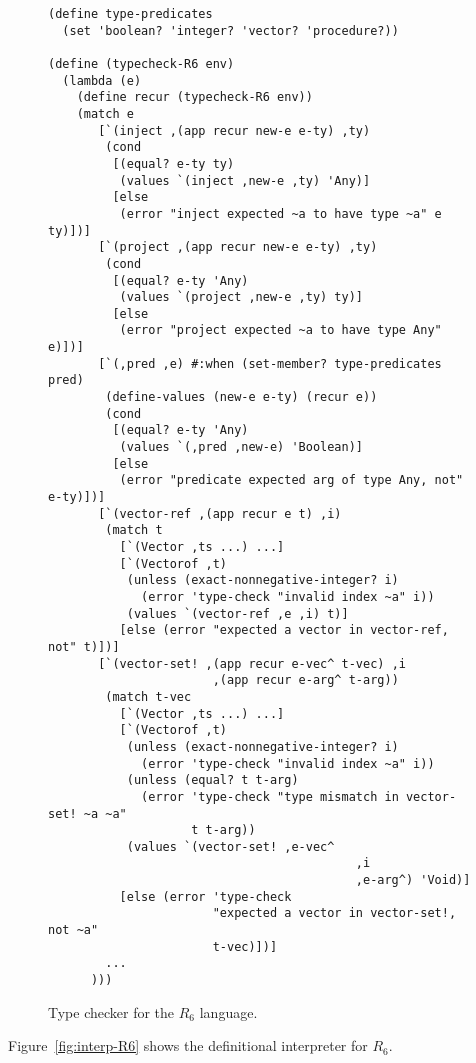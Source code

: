 \documentclass[11pt]{book}
\begin{document}
\begin{figure}[tbp]
\begin{lstlisting}[basicstyle=\ttfamily\footnotesize]
(define type-predicates
  (set 'boolean? 'integer? 'vector? 'procedure?))

(define (typecheck-R6 env)
  (lambda (e)
    (define recur (typecheck-R6 env))
    (match e
       [`(inject ,(app recur new-e e-ty) ,ty)
        (cond
         [(equal? e-ty ty)
          (values `(inject ,new-e ,ty) 'Any)]
         [else
          (error "inject expected ~a to have type ~a" e ty)])]
       [`(project ,(app recur new-e e-ty) ,ty)
        (cond
         [(equal? e-ty 'Any)
          (values `(project ,new-e ,ty) ty)]
         [else
          (error "project expected ~a to have type Any" e)])]
       [`(,pred ,e) #:when (set-member? type-predicates pred)
        (define-values (new-e e-ty) (recur e))
        (cond
         [(equal? e-ty 'Any)
          (values `(,pred ,new-e) 'Boolean)]
         [else
          (error "predicate expected arg of type Any, not" e-ty)])]
       [`(vector-ref ,(app recur e t) ,i)
        (match t
          [`(Vector ,ts ...) ...]
          [`(Vectorof ,t)
           (unless (exact-nonnegative-integer? i)
             (error 'type-check "invalid index ~a" i))
           (values `(vector-ref ,e ,i) t)]
          [else (error "expected a vector in vector-ref, not" t)])]
       [`(vector-set! ,(app recur e-vec^ t-vec) ,i
                       ,(app recur e-arg^ t-arg))
        (match t-vec
          [`(Vector ,ts ...) ...]
          [`(Vectorof ,t)
           (unless (exact-nonnegative-integer? i)
             (error 'type-check "invalid index ~a" i))
           (unless (equal? t t-arg)
             (error 'type-check "type mismatch in vector-set! ~a ~a"
                    t t-arg))
           (values `(vector-set! ,e-vec^
                                           ,i
                                           ,e-arg^) 'Void)]
          [else (error 'type-check
                       "expected a vector in vector-set!, not ~a"
                       t-vec)])]
        ...
      )))
\end{lstlisting}
\caption{Type checker for the $R_6$ language.}
\label{fig:typecheck-R6}
\end{figure}




Figure~\ref{fig:interp-R6} shows the definitional interpreter
for $R_6$.
\end{document}
